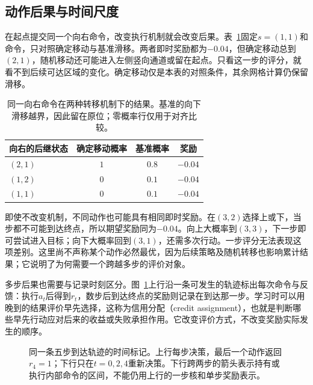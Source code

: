 \subsection{动作后果与时间尺度}
\label{sec:rl-overview-time-scale}

在起点提交同一个向右命令，改变执行机制就会改变后果。表~\ref{tab:rl-overview-transition}固定$s=(1,1)$和命令，只对照确定移动与基准滑移。两者即时奖励都为$-0.04$，但确定移动总到$(2,1)$，随机移动还可能进入左侧竖向通道或留在起点。只看这一步的评分，就看不到后续可达区域的变化。确定移动仅是本表的对照条件，其余网格计算仍保留滑移。

\begin{table}[htbp]
  \centering\small
  \begin{tabular}{@{}lccc@{}}
    \toprule
    向右的后继状态 & 确定移动概率 & 基准概率 & 奖励\\
    \midrule
    $(2,1)$ & $1$ & $0.8$ & $-0.04$\\
    $(1,2)$ & $0$ & $0.1$ & $-0.04$\\
    $(1,1)$ & $0$ & $0.1$ & $-0.04$\\
    \bottomrule
  \end{tabular}
  \caption{同一向右命令在两种转移机制下的结果。基准的向下滑移越界，因此留在原位；零概率行仅用于对齐比较。}
  \label{tab:rl-overview-transition}
\end{table}

即使不改变机制，不同动作也可能具有相同即时奖励。在$(3,2)$选择上或下，当步都不可能到达终点，所以期望奖励同为$-0.04$。向上大概率到$(3,3)$，下一步即可尝试进入目标；向下大概率回到$(3,1)$，还需多次行动。一步评分无法表现这项差别。这里尚不声称某个动作必然最优，因为后续策略及随机转移也影响累计结果；它说明了为何需要一个跨越多步的评价对象。

多步后果也需要与记录时刻区分。图~\ref{fig:rl-overview-timeline}上行沿一条可发生的轨迹标出每次命令与反馈：执行$a_t$后得到$r_t$，数步后到达终点的奖励则记录在到达那一步。学习时可以用晚到的结果评价早先选择，这称为信用分配（credit assignment），也就是判断哪些早先行动应对后来的收益或失败承担作用。它改变评价方式，不改变奖励实际发生的顺序。

\begin{figure}[htbp]
  \centering
  
  \caption{同一条五步到达轨迹的时间标记。上行每步决策，最后一个动作返回$r_4=1$；下行只在$t=0,2,4$重新决策。下行跨两步的箭头表示持有或执行内部命令的区间，不能仍用上行的一步核和单步奖励表示。}
  \label{fig:rl-overview-timeline}
\end{figure}

